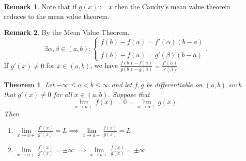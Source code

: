 \documentclass[12pt,openany]{book}
\newtheorem{theorem}{Theorem}[chapter]
\theoremstyle{definition}
\newtheorem{remark}{Remark}[chapter]
\begin{document}
	\begin{remark}
		Note that if $g(x):=x$ then the Cauchy's mean value theorem reduces to the mean value theorem.
	\end{remark}
	\begin{remark}
		By the Mean Value Theorem, \[
		\exists \alpha,\beta\in(a,b):\begin{cases}
			f(b)-f(a)=f'(\alpha)(b-a)\\
			\\
			f(b)-f(a)=g'(\beta)(b-a)
		\end{cases}.
		\] If $g'(x)\neq 0$ for $x\in(a,b)$, we have $\displaystyle
		\frac{f(b)-f(a)}{g(b)-g(a)}=\frac{f'(\alpha)}{g'(\beta)}.
		$
	\end{remark}
	\vspace{20pt}
	\begin{tcolorbox}[colback=white,colframe=thmcolor,arc=5pt,title={\color{white}\bf L'H\^{o}pital's Rule - 1st}]
		\begin{theorem}
			Let $-\infty\leq a<b\leq\infty$ and let $f,g$ be differentiable on $(a,b)$ such that $g'(x)\neq 0$ for all $x\in(a,b)$. Suppose that \[
			\lim\limits_{x\to a+}f(x)=0=\lim\limits_{x\to a+}g(x).
			\] Then \begin{enumerate}[(1)]
				\item $\displaystyle\lim\limits_{x\to a+}\frac{f'(x)}{g'(x)}=L\implies\lim\limits_{x\to a+}\frac{f(x)}{g(x)}=L$.
				\item $\displaystyle\lim\limits_{x\to a+}\frac{f'(x)}{g'(x)}=\pm\infty\implies\lim\limits_{x\to a+}\frac{f(x)}{g(x)}=\pm\infty$.
			\end{enumerate}
		\end{theorem}
	\end{tcolorbox}
\end{document}
